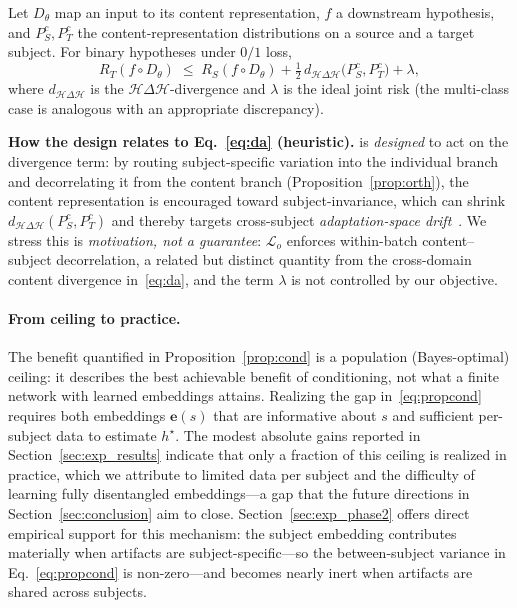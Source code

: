 \begin{proposition}
\label{prop:da}
Let $D_\theta$ map an input to its content representation, $f$ a downstream
hypothesis, and $P^{c}_S,P^{c}_T$ the content-representation distributions on a
source and a target subject. For binary hypotheses under $0/1$ loss,
\begin{equation}
  R_T(f\circ D_\theta)\;\le\;R_S(f\circ D_\theta)+\tfrac{1}{2}\,d_{\mathcal{H}\Delta\mathcal{H}}\big(P^{c}_S,P^{c}_T\big)+\lambda,
  \label{eq:da}
\end{equation}
where $d_{\mathcal{H}\Delta\mathcal{H}}$ is the $\mathcal{H}\Delta\mathcal{H}$-divergence
and $\lambda$ is the ideal joint risk (the multi-class case is analogous with an
appropriate discrepancy).
\end{proposition}

\noindent\textbf{How the design relates to Eq.~\eqref{eq:da} (heuristic).}
\saddpm{} is \emph{designed} to act on the divergence term: by routing
subject-specific variation into the individual branch and decorrelating it from
the content branch (Proposition~\ref{prop:orth}), the content representation is
encouraged toward subject-invariance, which can shrink
$d_{\mathcal{H}\Delta\mathcal{H}}(P^{c}_S,P^{c}_T)$ and thereby targets
cross-subject \emph{adaptation-space drift}~\cite{gheibi2024drift}. We stress this
is \emph{motivation, not a guarantee}: $\mathcal{L}_o$ enforces within-batch
content--subject decorrelation, a related but distinct quantity from the
cross-domain content divergence in~\eqref{eq:da}, and the term $\lambda$ is not
controlled by our objective.

\paragraph{From ceiling to practice.}
The benefit quantified in Proposition~\ref{prop:cond} is a population
(Bayes-optimal) ceiling: it describes the best achievable benefit of
conditioning, not what a finite network with learned embeddings attains. Realizing the gap
in~\eqref{eq:propcond} requires both embeddings $\mathbf{e}(s)$ that are
informative about $s$ and sufficient per-subject data to estimate $h^\star$. The
modest absolute gains reported in Section~\ref{sec:exp_results} indicate that only
a fraction of this ceiling is realized in practice, which we attribute to limited
data per subject and the difficulty of learning fully disentangled embeddings---a
gap that the future directions in Section~\ref{sec:conclusion} aim to close.
Section~\ref{sec:exp_phase2} offers direct empirical support for this mechanism:
the subject embedding contributes materially when artifacts are
subject-specific---so the between-subject variance in Eq.~\eqref{eq:propcond} is
non-zero---and becomes nearly inert when artifacts are shared across subjects.

